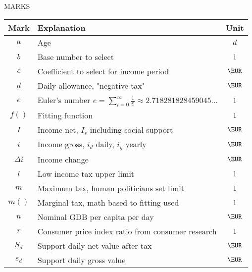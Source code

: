 %
%
%
MARKS
\label{marks}

\begin{center}
\begin{supertabular}{ c l c }
  Mark	 & Explanation					&  Unit		 \\
\hline
$ a	$& Age						&$ d		$\\
$ b	$& Base number to select			&$ 1		$\\
$ c	$& Coefficient to select for income period	&$ \EUR		$\\
$ d	$& Daily allowance, "negative tax"		&$ \EUR		$\\
$e$&Euler's number $e=\sum_{i=0}^{\infty}\frac1{i!}\approx2.718281828459045...$&$1$\\
$ f()	$& Fitting function				&$ 1		$\\
$ I	$& Income net, $I_s$ including social support	&$ \EUR		$\\
$ i	$& Income gross, $i_d$ daily, $i_y$ yearly	&$ \EUR		$\\
$\Delta i$& Income change				&$ \EUR		$\\
$ l	$& Low income tax upper limit			&$ 1		$\\
$ m	$& Maximum tax, human politicians set limit	&$ 1		$\\
$ m()	$& Marginal tax, math based to fitting used	&$ 1		$\\
$ n	$& Nominal GDB per capita per day		&$ \EUR		$\\
$ r	$& Consumer price index ratio from consumer research&$ 1	$\\
$ S_d	$& Support daily net value after tax		&$ \EUR		$\\
$ s_d	$& Support daily gross value			&$ \EUR		$\\

\end{supertabular}
\end{center}

